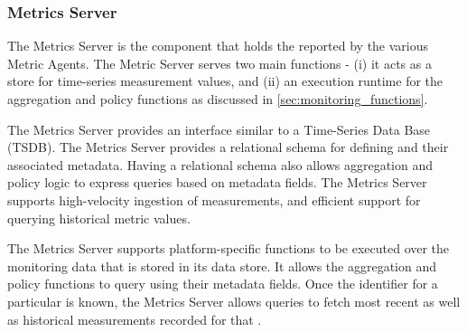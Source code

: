 \subsubsection{Metrics Server}
The Metrics Server is the component that holds the  reported by the various Metric Agents. The Metric Server serves two main functions - (i) it acts as a store for time-series measurement values, and (ii) an execution runtime for the aggregation and policy functions as discussed in \cref{sec:monitoring_functions}. 
\par The Metrics Server provides an interface similar to a Time-Series Data Base (TSDB). The Metrics Server provides a relational schema for defining  and their associated metadata. Having a relational schema also allows aggregation and policy logic to express queries based on metadata fields. The Metrics Server supports high-velocity ingestion of measurements, and efficient support for querying historical metric values.
\par The Metrics Server supports platform-specific functions to be executed over the monitoring data that is stored in its data store. It allows the aggregation and policy functions to query  using their metadata fields. Once the identifier for a particular  is known, the Metrics Server allows queries to fetch most recent as well as historical measurements recorded for that .

